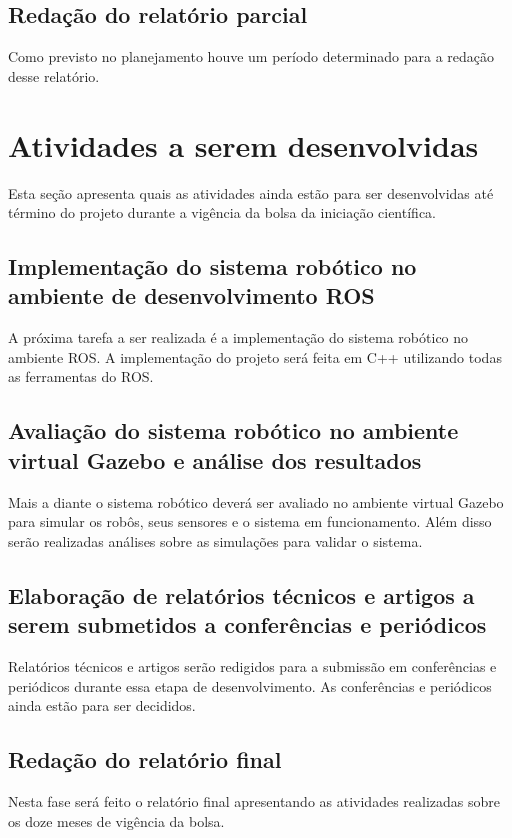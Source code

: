 \documentclass{article}
\begin{document}
\section{Redação do relatório parcial}
Como previsto no planejamento houve um período determinado para a redação desse relatório.

\chapter{Atividades a serem desenvolvidas}
Esta seção apresenta quais as atividades ainda estão para ser desenvolvidas até término do projeto durante a vigência da bolsa da iniciação científica.

\section{Implementação do sistema robótico no ambiente de desenvolvimento ROS}\label{implementacao}
A próxima tarefa a ser realizada é a implementação do sistema robótico no ambiente ROS. A implementação do projeto será feita em C++ utilizando todas as ferramentas do ROS.

\section{Avaliação do sistema robótico no ambiente virtual Gazebo e análise dos resultados}
Mais a diante o sistema robótico deverá ser avaliado no ambiente virtual Gazebo para simular os robôs, seus sensores e o sistema em funcionamento. Além disso serão realizadas análises sobre as simulações para validar o sistema.

\section{Elaboração de relatórios técnicos e artigos a serem submetidos a conferências e periódicos}
Relatórios técnicos e artigos serão redigidos para a submissão em conferências e periódicos durante essa etapa de desenvolvimento. As conferências e periódicos ainda estão para ser decididos.

\section{Redação do relatório final}
Nesta fase será feito o relatório final apresentando as atividades realizadas sobre os doze meses de vigência da bolsa.
\end{document}
